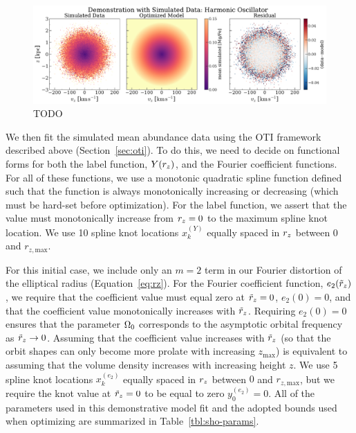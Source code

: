 \begin{figure}[t!]
\begin{center}
\includegraphics[width=\textwidth]{sho-data-model.pdf}
\end{center}
\caption{%
TODO
\label{fig:sho-data-model}
}
\end{figure}

We then fit the simulated mean  abundance data using the OTI framework
described above (Section~\ref{sec:oti}).
To do this, we need to decide on functional forms for both the label function, $Y(r_z)$,
and the Fourier coefficient functions.
For all of these functions, we use a monotonic quadratic spline function defined such
that the function is always monotonically increasing or decreasing (which must be
hard-set before optimization).
For the label function, we assert that the value must monotonically increase from $r_z =
0$ to the maximum spline knot location.
We use 10 spline knot locations $x_k^{(Y)}$ equally spaced in $r_z$ between $0$ and
$r_{z, \textrm{max}}$.

For this initial case, we include only an $m=2$ term in our Fourier distortion of the
elliptical radius (Equation~\ref{eq:rz}).
For the Fourier coefficient function, $e_2(\tilde{r}_z)$, we require that the coefficient value
must equal zero at $\tilde{r}_z = 0$, $e_2(0) = 0$, and that the coefficient value
monotonically increases with $\tilde{r}_z$.
Requiring $e_2(0) = 0$ ensures that the parameter $\Omega_0$ corresponds to the
asymptotic orbital frequency as $\tilde{r}_z \rightarrow 0$.
Assuming that the coefficient value increases with $\tilde{r}_z$ (so that the orbit shapes
can only become more prolate with increasing $z_{\textrm{max}}$) is equivalent to
assuming that the volume density increases with increasing height $z$.
We use 5 spline knot locations $x_k^{(e_2)}$ equally spaced in $r_z$ between $0$ and
$r_{z, \textrm{max}}$, but we require the knot value at $\tilde{r}_z = 0$ to be equal to zero
$y_0^{(e_2)}=0$.
All of the parameters used in this demonstrative model fit and the adopted bounds used
when optimizing are summarized in Table~\ref{tbl:sho-params}.

